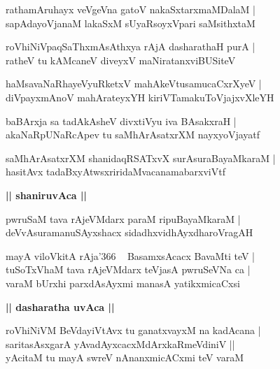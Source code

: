 \documentclass[twoside,12pt,openright]{book}
\newcounter{shloka}[chapter]
\def\uvaca#1{\centerline{{\large\textbf{#1}}}}
\begin{document}
\begin{shloka}%
rathamAruhayx veVgeVna gatoV nakaSxtarxmaMDalaM |\\
sapAdayoVjanaM lakaSxM sUyaRsoyxVpari saMsithxtaM 
\end{shloka}

\begin{shloka}%
roVhiNiVpaqSaThxmAsAthxya rAjA dasharathaH purA |\\
ratheV tu kAMcaneV diveyxV maNiratanxviBUSiteV
\end{shloka}

\begin{shloka}%
haMsavaNaRhayeVyuRketxV mahAkeVtusamucaCxrXyeV |\\
diVpayxmAnoV mahArateyxYH kiriVTamakuToVjajxvXleYH
\end{shloka}

\begin{shloka}%
baBArxja sa tadAkAsheV divxtiVyu iva BAsakxraH |\\
akaNaRpUNaRcApev tu saMhArAsatxrXM nayxyoVjayatf
\end{shloka}

\begin{shloka}%
saMhArAsatxrXM shanidaqRSATxvX surAsuraBayaMkaraM |\\
hasitAvx tadaBxyAtwsxriridaMvacanamabarxviVtf
\end{shloka}

\uvaca{|| shaniruvAca ||}

\begin{shloka}%
pwruSaM tava rAjeVMdarx paraM ripuBayaMkaraM |\\
deVvAsuramanuSAyxshacx sidadhxvidhAyxdharoVragAH
\end{shloka}

\begin{shloka}%
mayA viloVkitA rAja\char'366 ~ BasamxsAcacx BavaMti teV |\\
tuSoTxVhaM tava rAjeVMdarx teVjasA pwruSeVNa ca |\\
varaM bUrxhi parxdAsAyxmi manasA yatikxmicaCxsi
\end{shloka}

\uvaca{|| dasharatha uvAca ||}

\begin{shloka}%
roVhiNiVM BeVdayiVtAvx tu ganatxvayxM na kadAcana |\\
saritasAsxgarA yAvadAyxcacxMdArxkaRmeVdiniV ||\\
yAcitaM tu mayA swreV nAnanxmicACxmi teV varaM 
\end{shloka}
\end{document}
